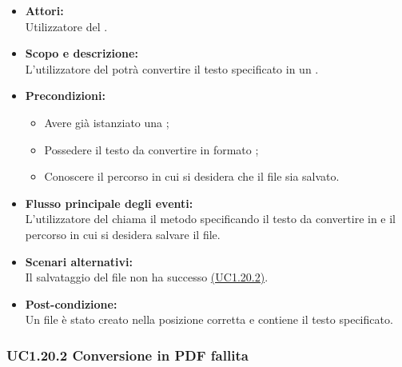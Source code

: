 \begin{itemize}
	\item \textbf{Attori:}
	\\Utilizzatore del .
	\item \textbf{Scopo e descrizione:} 
	\\L'utilizzatore del  potrà convertire il testo specificato in un .
	\item \textbf{Precondizioni:}
	\begin{itemize}
		\item Avere già istanziato una ;
		\item Possedere il testo da convertire in formato ;
		\item Conoscere il percorso in cui si desidera che il file sia salvato.
	\end{itemize}
	\item \textbf{Flusso principale degli eventi:}
	\\L'utilizzatore del  chiama il metodo specificando il testo da convertire in  e il percorso in cui si desidera salvare il file.
	\item \textbf{Scenari alternativi:}
	\\Il salvataggio del file  non ha successo \hyperref[UC1.20.2]{(UC1.20.2)}.
	\item \textbf{Post-condizione:}
	\\Un file  è stato creato nella posizione corretta e contiene il testo specificato.
\end{itemize}

\subsubsection{UC1.20.2 Conversione in PDF fallita} \label{UC1.20.2}

